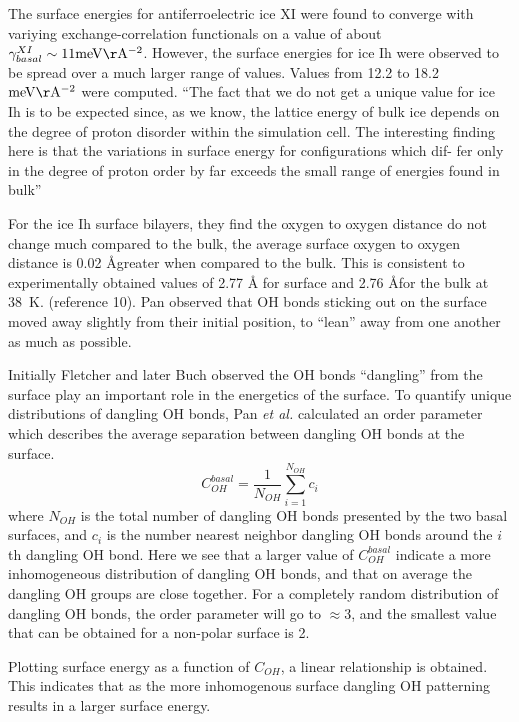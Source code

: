 The surface energies for antiferroelectric ice XI were found to
converge with variying exchange-correlation functionals on a value of
about $\gamma_{basal}^{XI} \sim 11 \mathrm{meV \AA^{-2}}$. However,
the surface energies for ice Ih were observed to be spread over a much
larger range of values. Values from 12.2 to 18.2
$\mathrm{meV \AA^{-2}}$ were computed. ``The fact that we do not get a
unique value for ice Ih is to be expected since, as we know, the
lattice energy of bulk ice depends on the degree of proton disorder
within the simulation cell. The interesting finding here is that the
variations in surface energy for configurations which dif- fer only in
the degree of proton order by far exceeds the small range of energies
found in bulk''

For the ice Ih surface bilayers, they find the oxygen to oxygen
distance do not change much compared to the bulk, the average surface
oxygen to oxygen distance is 0.02 \AA greater when compared to the
bulk. This is consistent to experimentally obtained values of 2.77 \AA
for surface and 2.76 \AA for the bulk at 38~K. (reference 10). Pan observed
that OH bonds sticking out on the surface moved away slightly from
their initial position, to ``lean'' away from one another as much as
possible. 

Initially Fletcher\cite{Fletcher} and later Buch\cite{Buch} observed
the OH bonds ``dangling'' from the surface play an important role in
the energetics of the surface. To quantify unique distributions of
dangling OH bonds, Pan \textit{et al.} calculated an order parameter
which describes the average separation between dangling OH bonds at
the surface.
\begin{equation}
C_{OH}^{basal} = \frac{1}{N_{OH}}\sum_{i=1}^{N_{OH}}c_{i}
\end{equation}
where $N_{OH}$ is the total number of dangling OH bonds presented by
the two basal surfaces, and $c_{i}$ is the number nearest neighbor
dangling OH bonds around the $i$th dangling OH bond. Here we see that
a larger value of $C_{OH}^{basal}$ indicate a more inhomogeneous
distribution of dangling OH bonds, and that on average the dangling OH
groups are close together. For a completely random distribution of
dangling OH bonds, the order parameter will go to $\approx 3$, and the
smallest value that can be obtained for a non-polar surface is 2.

Plotting surface energy as a function of $C_{OH}$, a linear
relationship is obtained. This indicates that as the more inhomogenous
surface dangling OH patterning results in a larger surface energy.

